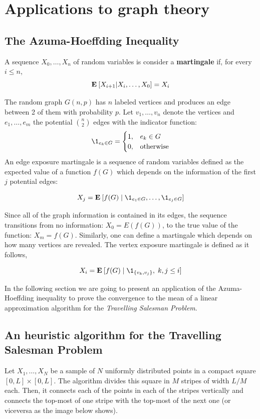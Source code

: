 \chapter{Applications to graph theory}

\section{The Azuma-Hoeffding Inequality}

\begin{definition}
    A sequence $X_0, \ldots, X_n$ of random variables is consider a \textbf{martingale} if, for every $i \leq n$,
    \[ \mathbf{E}\: [X_{i+1} | X_i,\ldots, X_0] = X_i \] 
\end{definition}

The random graph $G(n,p)$ has $n$ labeled vertices and produces an edge between 2 of them with probability $p$. Let $v_1, \ldots, v_n$ denote the vertices and $e_1, \ldots, e_m$ the potential ${n\choose 2}$ edges with the indicator function:
\[\1_{e_k \in G} = \begin{cases}
    1, & e_k \in G\\
    0, & \mbox{otherwise} 
\end{cases} \] 
An edge exposure martingale is a sequence of random variables defined as the expected value of a function $f(G)$ which depends on the information of the first $j$ potential edges:

\[ X_j = \E [f(G) \;|\; \1_{e_1 \in G}, \ldots, \1_{e_j \in G}] \] 

Since all of the graph information is contained in its edges, the sequence transitions from no information: $X_0 = E(f(G))$, to the true value of the function: $X_m = f(G)$. Similarly, one can define a martingale which depends on how many vertices are revealed. The vertex exposure martingale is defined as it follows,

\[ X_i = \E [f(G) \;|\; \1_{\{v_k, v_j\}}, \; k,j \leq i] \] 

In the following section we are going to present an application of the Azuma-Hoeffding inequality to prove the convergence to the mean of a linear approximation algorithm for the \textit{Travelling Salesman Problem}. 

\section{An heuristic algorithm for the Travelling Salesman Problem}

Let $X_1,\ldots, X_N$ be a sample of $N$ uniformly distributed points in a compact square $[0,L]\times [0,L]$. The algorithm divides this square in $M$ stripes of width $L/M$ each. Then, it connects each of the points in each of the stripes vertically and connects the top-most of one stripe with the top-most of the next one (or viceversa as the image below shows).

